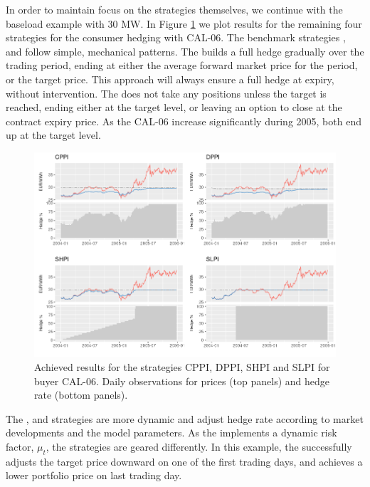 In order to maintain focus on the strategies themselves, we continue with the baseload example with 30 MW. In Figure \ref{fig:buyer_strat} we plot results for the remaining four strategies for the consumer hedging with CAL-06. The benchmark strategies , and  follow simple, mechanical patterns. The  builds a full hedge gradually over the trading period, ending at either the average forward market price for the period, or the target price. This approach will always ensure a full hedge at expiry, without intervention. The  does not take any positions unless the target is reached, ending either at the target level, or leaving an option to close at the contract expiry price. As the CAL-06 increase significantly during 2005, both end up at the target level.

\begin{figure}[!htb]
\includegraphics [scale = 0.58] {buyer_strat.png}
\caption{Achieved results for the strategies CPPI, DPPI, SHPI and SLPI for buyer CAL-06. Daily observations for prices (top panels) and hedge rate (bottom panels).}
\label{fig:buyer_strat}
\end{figure}

The , and  strategies are more dynamic and adjust hedge rate according to market developments and the model parameters. As the  implements a dynamic risk factor, $\mu_t$, the strategies are geared differently. In this example, the  successfully adjusts the target price downward on one of the first trading days, and achieves a lower portfolio price on last trading day.

